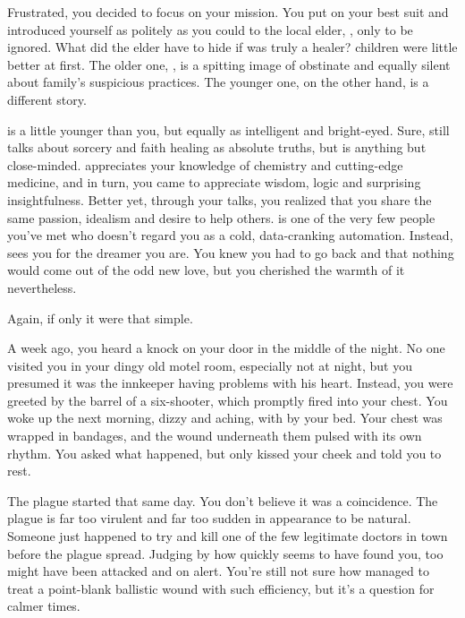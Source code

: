 \documentclass[char]{Pestilence}
\begin{document}
Frustrated, you decided to focus on your mission. You put on your best suit and introduced yourself as politely as you could to the local elder, \cElder{\intro}, only to be ignored. What did the elder have to hide if \cElder{\they} was truly a healer? \cElder{\Their} children were little better at first. The older one, \cApprentice{}, is a spitting image of \cApprentice{\their} obstinate \cElder{\parent} and equally silent about \cApprentice{\their} family's suspicious practices. The younger one, on the other hand, is a different story.

\cRebel{} is a little younger than you, but equally as intelligent and bright-eyed. Sure, \cRebel{\they} still talks about sorcery and faith healing as absolute truths, but \cRebel{\they} is anything but close-minded. \cRebel{} appreciates your knowledge of chemistry and cutting-edge medicine, and in turn, you came to appreciate \cRebel{\their} wisdom, logic and surprising insightfulness. Better yet, through your talks, you realized that you share the same passion, idealism and desire to help others. \cRebel{} is one of the very few people you've met who doesn't regard you as a cold, data-cranking automation. Instead, \cRebel{\they} sees you for the dreamer you are. You knew you had to go back and that nothing would come out of the odd new love, but you cherished the warmth of it nevertheless.

Again, if only it were that simple. 

A week ago, you heard a knock on your door in the middle of the night. No one visited you in your dingy old motel room, especially not at night, but you presumed it was the innkeeper having problems with his heart. Instead, you were greeted by the barrel of a six-shooter, which promptly fired into your chest. You woke up the next morning, dizzy and aching, with \cRebel{} by your bed. Your chest was wrapped in bandages, and the wound underneath them pulsed with its own rhythm. You asked \cRebel{} what happened, but \cRebel{\they} only kissed your cheek and told you to rest.

The plague started that same day. You don't believe it was a coincidence. The plague is far too virulent and far too sudden in appearance to be natural. Someone just happened to try and kill one of the few legitimate doctors in town before the plague spread. Judging by how quickly \cRebel{} seems to have found you, \cRebel{\they} too might have been attacked and on alert. You're still not sure how \cRebel{} managed to treat a point-blank ballistic wound with such efficiency, but it's a question for calmer times. 
\end{document}
